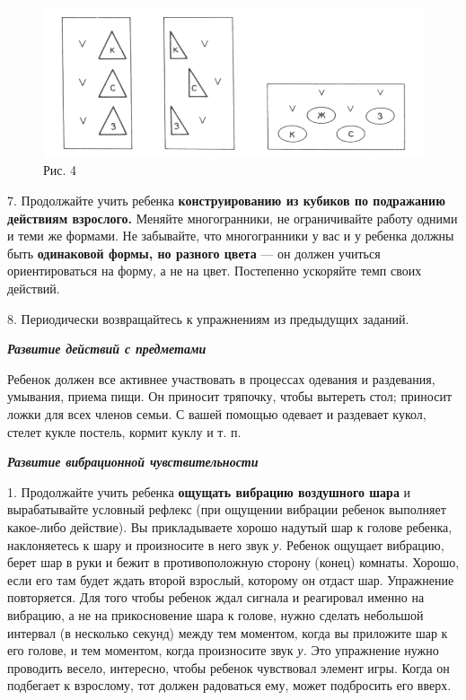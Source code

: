 \documentclass{book}
\renewcommand{\emph}[1]{\textit{#1}}
\begin{document}
\begin{figure}
\centering
\includegraphics[width=\linewidth]{media/media/image4.png} 
\caption*{Рис. 4}
\end{figure}

7. Продолжайте учить ребенка \textbf{конструированию из кубиков по
подражанию действиям взрослого.} Меняйте многогранники, не ограничивайте
работу одними и теми же формами. Не забывайте, что многогранники у вас и
у ребенка должны быть \textbf{одинаковой формы, но разного цвета} --- он
должен учиться ориентироваться на форму, а не на цвет. Постепенно
ускоряйте темп своих действий.

8. Периодически возвращайтесь к упражнениям из предыдущих заданий.

\emph{\textbf{Развитие действий с предметами}}

Ребенок должен все активнее участвовать в процессах одевания и
раздевания, умывания, приема пищи. Он приносит тряпочку, чтобы вытереть
стол; приносит ложки для всех членов семьи. С вашей помощью одевает и
раздевает кукол, стелет кукле постель, кормит куклу и т. п.

\emph{\textbf{Развитие вибрационной чувствительности}}

1. Продолжайте учить ребенка \textbf{ощущать вибрацию воздушного шара} и
вырабатывайте условный рефлекс (при ощущении вибрации ребенок выполняет
какое-либо действие). Вы прикладываете хорошо надутый шар к голове
ребенка, наклоняетесь к шару и произносите в него звук \emph{у.} Ребенок
ощущает вибрацию, берет шар в руки и бежит в противоположную сторону
(конец) комнаты. Хорошо, если его там будет ждать второй взрослый,
которому он отдаст шар. Упражнение повторяется. Для того чтобы ребенок
ждал сигнала и реагировал именно на вибрацию, а не на прикосновение шара
к голове, нужно сделать небольшой интервал (в несколько секунд) между
тем моментом, когда вы приложите шар к его голове, и тем моментом, когда
произносите звук \emph{у.} Это упражнение нужно проводить весело,
интересно, чтобы ребенок чувствовал элемент игры. Когда он подбегает к
взрослому, тот должен радоваться ему, может подбросить его вверх.
\end{document}
